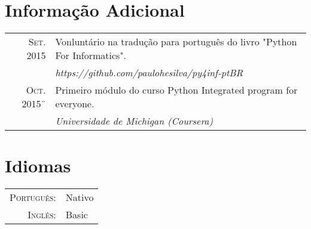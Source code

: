 \documentclass[a4paper,10pt]{article}
\begin{document}
\section{Informação Adicional}
\begin{tabular}{rl}
\textsc{Set. 2015} & Vonluntário na tradução para português do livro "Python For Informatics".\normalsize\\ &\emph{https://github.com/paulohesilva/py4inf-ptBR}\\
\textsc{Oct. 2015}¨& Primeiro módulo do curso Python Integrated program for everyone.\normalsize\\
&\emph{Universidade de Michigan (Coursera)}\\
\end{tabular}

\section{Idiomas}
\begin{tabular}{rl}
 \textsc{Português:}&Nativo\\
\textsc{Inglês:}&Basic\\
\end{tabular}
\end{document}
